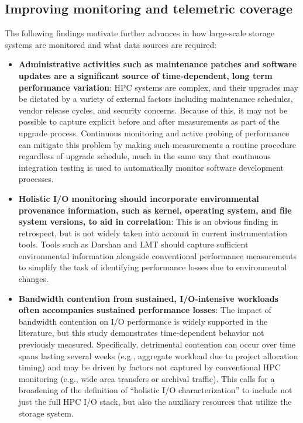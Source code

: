 \subsection{Improving monitoring and telemetric coverage}

The following findings motivate further advances in how large-scale storage systems are monitored and what data sources are required:


\begin{itemize}[leftmargin=*]

\item \textbf{Administrative activities such as maintenance patches and
software updates are a significant source of time-dependent, long term
performance variation}:
HPC systems are complex, and their upgrades may be dictated by a variety of external factors including maintenance schedules, vendor release cycles, and security concerns.
Because of this, it may not be possible to capture explicit before and after measurements as part of the upgrade process.
Continuous monitoring and active probing of performance can mitigate this problem by making such measurements a routine procedure regardless of upgrade schedule, much in the same way that continuous integration testing is used to automatically monitor software development processes.

\item \textbf{Holistic I/O monitoring should incorporate environmental
provenance information, such as kernel, operating system, and file system versions, to aid in correlation}: 
This is an obvious finding in retrospect, but is not widely taken into
account in current instrumentation tools.
Tools such as Darshan and LMT should capture sufficient environmental information alongside conventional performance measurements to
simplify the task of identifying performance losses due to environmental changes.

\item \textbf{Bandwidth contention from sustained, I/O-intensive workloads often accompanies sustained performance losses}:
The impact of bandwidth contention on I/O performance is widely supported in the literature, but this study demonstrates time-dependent behavior not previously measured.
Specifically, detrimental contention
can occur over time spans lasting several weeks (e.g., aggregate
workload due to project allocation timing) and may be driven by factors 
not captured by conventional HPC monitoring (e.g., wide area transfers or archival traffic).
This calls for a broadening of the definition of ``holistic I/O characterization'' to include not just the full HPC I/O stack, but also the auxiliary resources that utilize the storage system.

\end{itemize}


